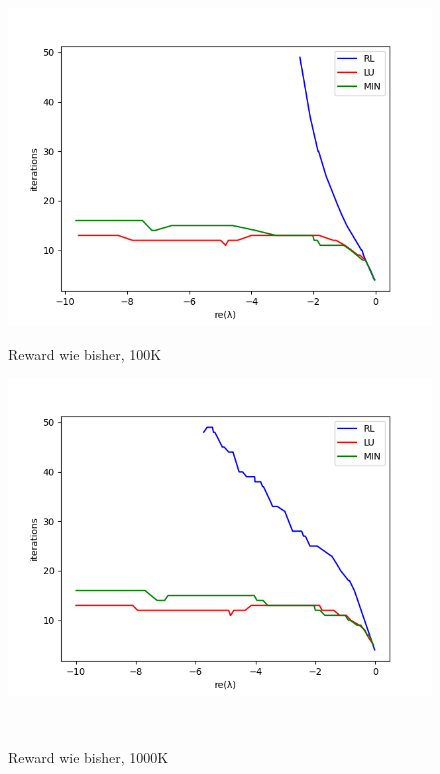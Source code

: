 \documentclass[]{article}
\begin{document}
\begin{figure}[h]
	\begin{minipage}[b]{.6\linewidth} %
		\includegraphics[width=\linewidth]{old.png}
		\caption{Reward wie bisher, 100K}
	\end{minipage}
	\begin{minipage}[b]{.6\linewidth} %
		\includegraphics[width=\linewidth]{old1000.png}
		\caption{Reward wie bisher, 1000K}
	\end{minipage}\\
	\begin{minipage}[b]{.6\linewidth} %

\end{minipage}
\end{figure}
\end{document}
